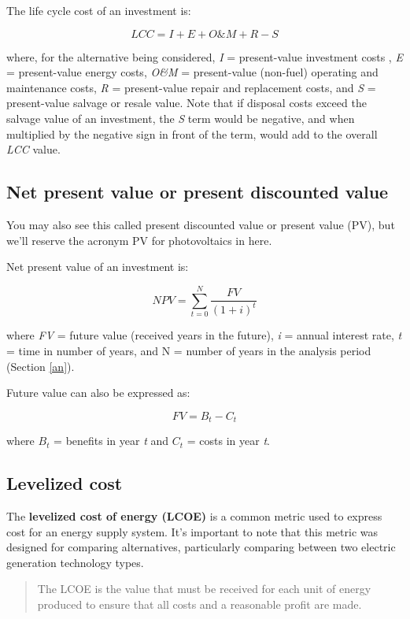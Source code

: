 \documentclass[10pt]{article}
\begin{document}
The life cycle cost of an investment is:

$$LCC = I + E + O\&M + R - S$$

where, for the alternative being considered,  \textit{I} = present-value investment costs , \textit{E} = present-value energy costs, \textit{O\&M} = present-value (non-fuel) operating and maintenance costs, \textit{R} = present-value repair and replacement costs, and \textit{S} = present-value salvage or resale value. Note that if disposal costs exceed the salvage value of an investment, the \textit{S} term would be negative, and when multiplied by the negative sign in front of the term, would add to the overall \textit{LCC} value.



\subsection{Net present value or present discounted value}

You may also see this called present discounted value \cite{Greenlaw2017} or present value (PV), but we'll reserve the acronym PV for photovoltaics in here.

Net present value of an investment is:

$$NPV = \sum_{t=0}^{N} \frac{FV}{(1+i)^t}$$

where \textit{FV} = future value (received years in the future), \textit{i} = annual interest rate, \textit{t} = time in number of years, and N = number of years in the analysis period (Section \ref{an}). \cite{Greenlaw2017}

Future value can also be expressed as:

$$FV=B_t-C_t$$

where $B_t$ = benefits in year \textit{t} and $C_t$ = costs in year \textit{t}. \cite{Goswami2007-hf}

\subsection{Levelized cost}

The \textbf{levelized cost of energy (LCOE)} is a common metric used to express cost for an energy supply system. It's important to note that this metric was designed for comparing alternatives, particularly comparing between two electric generation technology types.

\begin{quote}
    The LCOE is the value that must be received for each unit of energy produced to ensure that all costs and a reasonable profit are made. \cite{Goswami2007-hf}
\end{quote}
\end{document}
